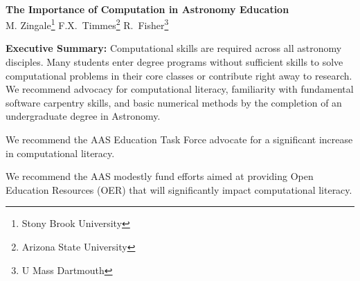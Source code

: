 \documentclass[11pt]{article}
\begin{document}
\thispagestyle{plain}

\mbox{ }\vspace{-0.7in}

\begin{center}
{\Large \sffamily \bfseries The Importance of Computation in Astronomy Education} \\
{
M. Zingale\footnote{Stony Brook University}
F.X.~Timmes\footnote{Arizona State University}
R.~Fisher\footnote{U Mass Dartmouth}
}
\end{center}

\begin{tcolorbox}
{\sffamily \bfseries Executive Summary:} Computational skills are required
across all astronomy disciples. 
Many students enter degree programs without sufficient skills
to solve computational problems in their core classes or contribute right away to research. 
We recommend advocacy for computational literacy, familiarity with fundamental
software carpentry skills, and basic numerical methods by the
completion of an undergraduate degree in Astronomy.  

\vspace {0.1in} We recommend the AAS Education Task Force advocate for
a significant increase in computational literacy.

\vspace {0.1in} We recommend the AAS modestly fund efforts aimed at
providing Open Education Resources (OER) that will significantly
impact computational literacy.






\end{tcolorbox}
\end{document}
